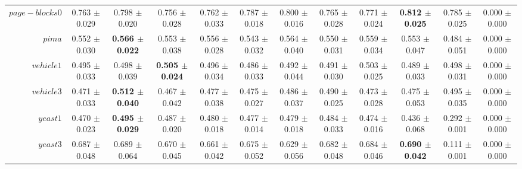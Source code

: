 \begin{table}[!ht]
{\begin{tabular}{r c c c c c c c c c c c}
$page-blocks0$ & 0.763 $\pm$ 0.029 & 0.798 $\pm$ 0.020 & 0.756 $\pm$ 0.028 & 0.762 $\pm$ 0.033 & 0.787 $\pm$ 0.018 & 0.800 $\pm$ 0.016 & 0.765 $\pm$ 0.028 & 0.771 $\pm$ 0.024 & \textbf{0.812 $\pm$ 0.025} & 0.785 $\pm$ 0.025 & 0.000 $\pm$ 0.000 \\
$pima$ & 0.552 $\pm$ 0.030 & \textbf{0.566 $\pm$ 0.022} & 0.553 $\pm$ 0.038 & 0.556 $\pm$ 0.028 & 0.543 $\pm$ 0.032 & 0.564 $\pm$ 0.040 & 0.550 $\pm$ 0.031 & 0.559 $\pm$ 0.034 & 0.553 $\pm$ 0.047 & 0.484 $\pm$ 0.051 & 0.000 $\pm$ 0.000 \\
$vehicle1$ & 0.495 $\pm$ 0.033 & 0.498 $\pm$ 0.039 & \textbf{0.505 $\pm$ 0.024} & 0.496 $\pm$ 0.034 & 0.486 $\pm$ 0.033 & 0.492 $\pm$ 0.044 & 0.491 $\pm$ 0.030 & 0.503 $\pm$ 0.025 & 0.489 $\pm$ 0.033 & 0.498 $\pm$ 0.031 & 0.000 $\pm$ 0.000 \\
$vehicle3$ & 0.471 $\pm$ 0.033 & \textbf{0.512 $\pm$ 0.040} & 0.467 $\pm$ 0.042 & 0.477 $\pm$ 0.038 & 0.475 $\pm$ 0.027 & 0.486 $\pm$ 0.037 & 0.490 $\pm$ 0.025 & 0.473 $\pm$ 0.028 & 0.475 $\pm$ 0.053 & 0.495 $\pm$ 0.035 & 0.000 $\pm$ 0.000 \\
$yeast1$ & 0.470 $\pm$ 0.023 & \textbf{0.495 $\pm$ 0.029} & 0.487 $\pm$ 0.020 & 0.480 $\pm$ 0.018 & 0.477 $\pm$ 0.014 & 0.479 $\pm$ 0.018 & 0.484 $\pm$ 0.033 & 0.474 $\pm$ 0.016 & 0.436 $\pm$ 0.068 & 0.292 $\pm$ 0.001 & 0.000 $\pm$ 0.000 \\
$yeast3$ & 0.687 $\pm$ 0.048 & 0.689 $\pm$ 0.064 & 0.670 $\pm$ 0.045 & 0.661 $\pm$ 0.042 & 0.675 $\pm$ 0.052 & 0.629 $\pm$ 0.056 & 0.682 $\pm$ 0.048 & 0.684 $\pm$ 0.046 & \textbf{0.690 $\pm$ 0.042} & 0.111 $\pm$ 0.001 & 0.000 $\pm$ 0.000 \\
\end{tabular}}
\end{table}
